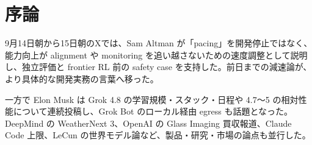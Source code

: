 \section{序論}
9月14日朝から15日朝のXでは、Sam Altman が「pacing」を開発停止ではなく、能力向上が alignment や monitoring を追い越さないための速度調整として説明し、独立評価と frontier RL 前の safety case を支持した。前日までの減速論が、より具体的な開発実務の言葉へ移った。

一方で Elon Musk は Grok 4.8 の学習規模・スタック・日程や 4.7〜5 の相対性能について連続投稿し、Grok Bot のローカル経由 egress も話題となった。DeepMind の WeatherNext 3、OpenAI の Glass Imaging 買収報道、Claude Code 上限、LeCun の世界モデル論など、製品・研究・市場の論点も並行した。

